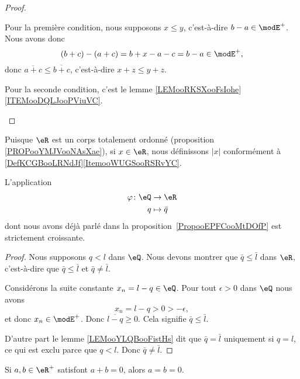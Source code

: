 \begin{proof}
\begin{subproof}
		Pour la première condition, nous supposons \( x\leq y\), c'est-à-dire \( b-a\in \modE^+\). Nous avons donc
		\begin{equation}
			(b+c)-(a+c)=b+x-a-c=b-a\in \modE^+,
		\end{equation}
		donc \( \overline{ a+c }\leq \overline{ b+c }\), c'est-à-dire \( x+z\leq y+z\).

		Pour la seconde condition, c'est le lemme \ref{LEMooRKSXooFsIohe}\ref{ITEMooDQLJooPViuVC}.
	\end{subproof}
\end{proof}


\begin{definition}
	Puisque \( \eR\) est un corps totalement ordonné (proposition \ref{PROPooYMJVooNAsXae}), si \( x\in \eR\), nous définissons \( | x |\) conformément à \ref{DefKCGBooLRNdJf}\ref{ItemooWUGSooRSRvYC}.
\end{definition}

\begin{lemma}       \label{LEMooTJAXooKEqPCG}
	L'application
	\begin{equation}
		\begin{aligned}
			\varphi\colon \eQ & \to \eR        \\
			q                 & \mapsto \bar q
		\end{aligned}
	\end{equation}
	dont nous avons déjà parlé dans la proposition~\ref{PropooEPFCooMtDOfP} est strictement croissante.
\end{lemma}

\begin{proof}
	Nous supposons \( q< l\) dans \( \eQ\). Nous devons montrer que \( \bar q\leq \bar l\) dans \( \eR\), c'est-à-dire que \( \bar q\leq \bar l\) et \( \bar q\neq \bar l\).

	Considérons la suite constante \( x_n=l-q\in \eQ\). Pour tout \( \epsilon>0\) dans \( \eQ\) nous avons
	\begin{equation}
		x_n=l-q>0>-\epsilon,
	\end{equation}
	et donc \( x_n\in\modE^+\). Donc \( \overline{ l-q }\geq 0\). Cela signifie \( \bar q\leq \bar l\).

	D'autre part le lemme \ref{LEMooYLQBooFistHs} dit que \( \bar q=\bar l\) uniquement si \( q=l\), ce qui est exclu parce que \( q<l\). Donc \( \bar q\neq\bar l\).
\end{proof}

\begin{lemma}       \label{LEMooNHMTooEdtBnQ}
	Si \( a,b\in \eR^+\) satisfont \( a+b=0\), alors \( a=b=0\).
\end{lemma}

